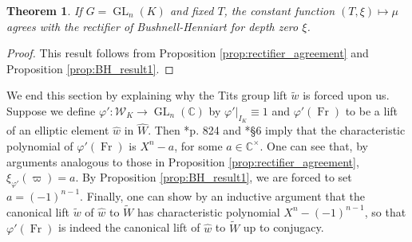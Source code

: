 \documentclass{amsart}
\theoremstyle{plain}
\newtheorem{theorem}{Theorem}[section]
\theoremstyle{definition}
\numberwithin{equation}{section}
\DeclareMathOperator{\Fr}{Fr}
\DeclareMathOperator{\GL}{GL}
\newcommand{\CC}{\mathbb{C}}
\newcommand{\CCx}{\mathbb{C}^\times}
\newcommand{\Weil}{\mathcal{W}}
\begin{document}
\begin{theorem} \label{thm:bh_agreement}
  If $G = \GL_{n}(K)$ and fixed $T$, the constant function $(T,\xi) \mapsto \mu$ agrees with
  the rectifier of Bushnell-Henniart for depth zero $\xi$.
\end{theorem}

\begin{proof}
This result follows from Proposition \ref{prop:rectifier_agreement} and Proposition \ref{prop:BH_result1}.
\end{proof}

We end this section by explaining why the Tits group lift $\tilde{w}$ is forced upon us.
Suppose we define
$\varphi' : \Weil_K \rightarrow \GL_{n}(\CC)$ by $\varphi'|_{I_K} \equiv 1$ and
$\varphi'(\Fr)$ to be a lift of an elliptic element $\hat{w}$ in $\hat{W}$.
Then \cite{reeder-debacker:09a}*{p. 824} and \cite{reeder:08a}*{\S6} imply that the characteristic
polynomial of $\varphi'(\Fr)$ is $X^n - a$, for some $a \in \CCx$.  One can see that,
by arguments analogous to those in Proposition \ref{prop:rectifier_agreement},
$\xi_{\varphi'}(\varpi) = a$.  By Proposition \ref{prop:BH_result1}, we are
forced to set $a = (-1)^{n-1}$.  Finally, one can show by an inductive argument that the
canonical lift $\tilde{w}$ of $\hat{w}$ to $\widetilde{W}$ has characteristic polynomial $X^n - (-1)^{n-1}$,
so that $\varphi'(\Fr)$ is indeed the canonical lift of $\hat{w}$ to $\widetilde{W}$ up to conjugacy.

%

\end{document}
